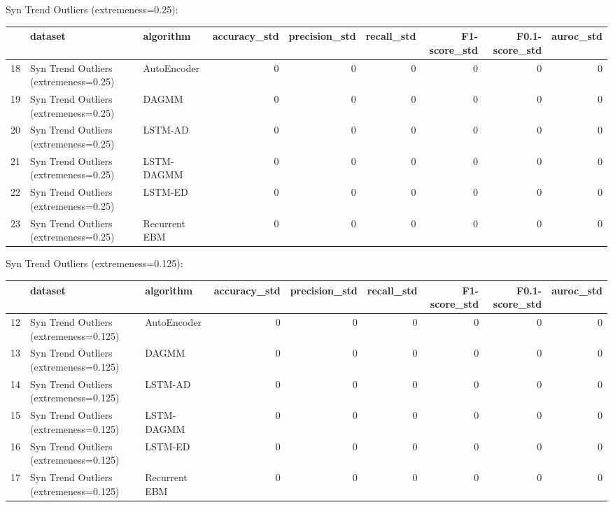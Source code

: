 Syn Trend Outliers (extremeness=0.25):

\begin{tabular}{rllrrrrrr}
\hline
    & dataset                               & algorithm     &   accuracy\_std &   precision\_std &   recall\_std &   F1-score\_std &   F0.1-score\_std &   auroc\_std \\
\hline
 18 & Syn Trend Outliers (extremeness=0.25) & AutoEncoder   &              0 &               0 &            0 &              0 &                0 &           0 \\
 19 & Syn Trend Outliers (extremeness=0.25) & DAGMM         &              0 &               0 &            0 &              0 &                0 &           0 \\
 20 & Syn Trend Outliers (extremeness=0.25) & LSTM-AD       &              0 &               0 &            0 &              0 &                0 &           0 \\
 21 & Syn Trend Outliers (extremeness=0.25) & LSTM-DAGMM    &              0 &               0 &            0 &              0 &                0 &           0 \\
 22 & Syn Trend Outliers (extremeness=0.25) & LSTM-ED       &              0 &               0 &            0 &              0 &                0 &           0 \\
 23 & Syn Trend Outliers (extremeness=0.25) & Recurrent EBM &              0 &               0 &            0 &              0 &                0 &           0 \\
\hline
\end{tabular}

Syn Trend Outliers (extremeness=0.125):

\begin{tabular}{rllrrrrrr}
\hline
    & dataset                                & algorithm     &   accuracy\_std &   precision\_std &   recall\_std &   F1-score\_std &   F0.1-score\_std &   auroc\_std \\
\hline
 12 & Syn Trend Outliers (extremeness=0.125) & AutoEncoder   &              0 &               0 &            0 &              0 &                0 &           0 \\
 13 & Syn Trend Outliers (extremeness=0.125) & DAGMM         &              0 &               0 &            0 &              0 &                0 &           0 \\
 14 & Syn Trend Outliers (extremeness=0.125) & LSTM-AD       &              0 &               0 &            0 &              0 &                0 &           0 \\
 15 & Syn Trend Outliers (extremeness=0.125) & LSTM-DAGMM    &              0 &               0 &            0 &              0 &                0 &           0 \\
 16 & Syn Trend Outliers (extremeness=0.125) & LSTM-ED       &              0 &               0 &            0 &              0 &                0 &           0 \\
 17 & Syn Trend Outliers (extremeness=0.125) & Recurrent EBM &              0 &               0 &            0 &              0 &                0 &           0 \\
\hline
\end{tabular}

